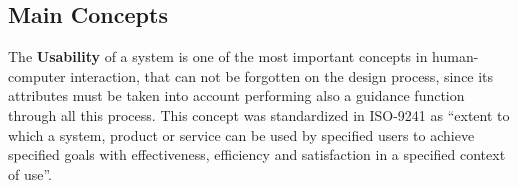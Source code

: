 



\subsection{Main Concepts}
\label{subsec:main_concepts}
The \textbf{Usability} of a system is one of the most important concepts in human-computer interaction, that can not be forgotten on the design process, since its attributes must be taken into account performing also a guidance function through all this process. This concept was standardized in ISO-9241 \cite{iso9241-11_2018} as “extent to which a system, product or service can be used by specified users to achieve specified goals with effectiveness, efficiency and satisfaction in a specified context of use”.

